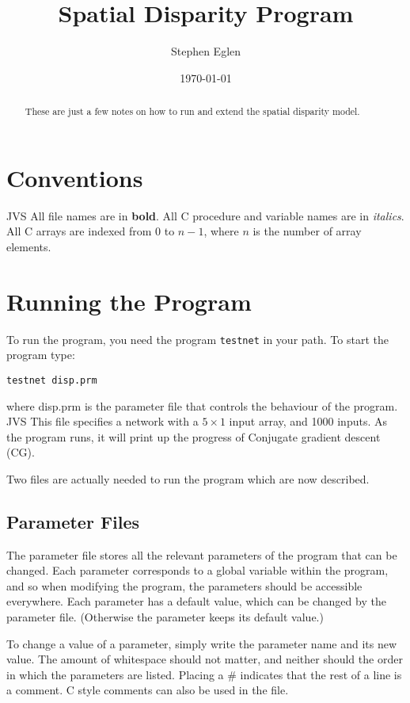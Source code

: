 \documentclass[a4paper]{article}
\begin{document}
\title{ Spatial Disparity Program}
\author{Stephen Eglen}
\date{\today}
\maketitle

\begin{abstract}
  These are just a few notes on how to run and extend the spatial
  disparity model.
\end{abstract}

\section{Conventions}

JVS All file names are in {\bf bold}. All C procedure and variable
names are in {\em italics}. All C arrays are indexed from 0 to $n-1$,
where $n$ is the number of array elements.

\section{Running the Program}

To run the program, you need the program \texttt{testnet} in your path.  To
start the program type:

\texttt{testnet disp.prm}

where disp.prm is the parameter file that controls the behaviour of
the program.  JVS This file specifies a network with a $5\times1$
input array, and 1000 inputs. As the program runs, it will print up
the progress of Conjugate gradient descent (CG).

Two files are actually needed to run the program which are now described.

\subsection{Parameter Files}

The parameter file stores all the relevant parameters of the program
that can be changed.  Each parameter corresponds to a global variable
within the program, and so when modifying the program, the parameters
should be accessible everywhere.  Each parameter has a default value,
which can be changed by the parameter file.  (Otherwise the parameter
keeps its default value.)

To change a value of a parameter, simply write the parameter name and
its new value.  The amount of whitespace should not matter, and
neither should the order in which the parameters are listed.  Placing
a \# indicates that the rest of a line is a comment.  C style comments
can also be used in the file.
\end{document}
